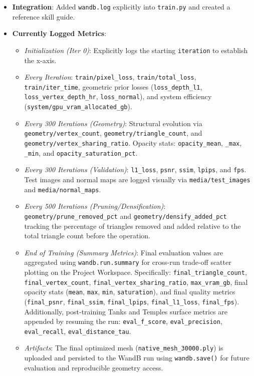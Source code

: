 \begin{itemize}
    \item \textbf{Integration}: Added \texttt{wandb.log} explicitly into \texttt{train.py} and created a reference skill guide.
    \item \textbf{Currently Logged Metrics}:
    \begin{itemize}
        \item \textit{Initialization (Iter 0)}: Explicitly logs the starting \texttt{iteration} to establish the x-axis.
        \item \textit{Every Iteration}: \texttt{train/pixel\_loss}, \texttt{train/total\_loss}, \texttt{train/iter\_time}, geometric prior losses (\texttt{loss\_depth\_l1}, \texttt{loss\_vertex\_depth\_hr}, \texttt{loss\_normal}), and system efficiency (\texttt{system/gpu\_vram\_allocated\_gb}).
        \item \textit{Every 300 Iterations (Geometry)}: Structural evolution via \texttt{geometry/vertex\_count}, \texttt{geometry/triangle\_count}, and \texttt{geometry/vertex\_sharing\_ratio}. Opacity stats: \texttt{opacity\_mean}, \texttt{\_max}, \texttt{\_min}, and \texttt{opacity\_saturation\_pct}.
        \item \textit{Every 300 Iterations (Validation)}: \texttt{l1\_loss}, \texttt{psnr}, \texttt{ssim}, \texttt{lpips}, and \texttt{fps}. Test images and normal maps are logged visually via \texttt{media/test\_images} and \texttt{media/normal\_maps}.
        \item \textit{Every 500 Iterations (Pruning/Densification)}: \texttt{geometry/prune\_removed\_pct} and \texttt{geometry/densify\_added\_pct} tracking the percentage of triangles removed and added relative to the total triangle count before the operation.
        \item \textit{End of Training (Summary Metrics)}: Final evaluation values are aggregated using \texttt{wandb.run.summary} for cross-run trade-off scatter plotting on the Project Workspace. Specifically: \texttt{final\_triangle\_count}, \texttt{final\_vertex\_count}, \texttt{final\_vertex\_sharing\_ratio}, \texttt{max\_vram\_gb}, final opacity stats (\texttt{mean}, \texttt{max}, \texttt{min}, \texttt{saturation}), and final quality metrics (\texttt{final\_psnr}, \texttt{final\_ssim}, \texttt{final\_lpips}, \texttt{final\_l1\_loss}, \texttt{final\_fps}). Additionally, post-training Tanks and Temples surface metrics are appended by resuming the run: \texttt{eval\_f\_score}, \texttt{eval\_precision}, \texttt{eval\_recall}, \texttt{eval\_distance\_tau}.
        \item \textit{Artifacts}: The final optimized mesh (\texttt{native\_mesh\_30000.ply}) is uploaded and persisted to the WandB run using \texttt{wandb.save()} for future evaluation and reproducible geometry access.
    \end{itemize}
\end{itemize}

